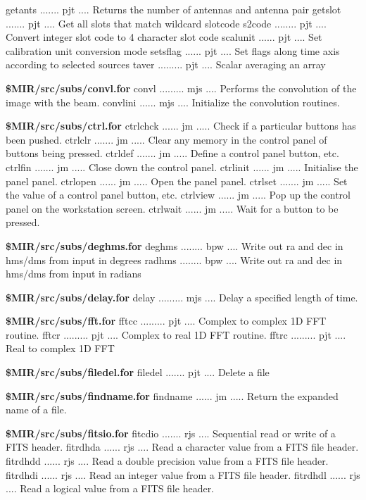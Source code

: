 {\eightpoint\begintt
getants ....... pjt .... Returns the number of antennas and antenna pair
getslot ....... pjt .... Get all slots that match wildcard slotcode
s2code ........ pjt .... Convert integer slot code to 4 character slot code
scalunit ...... pjt .... Set calibration unit conversion mode
setsflag ...... pjt .... Set flags along time axis according to selected sources
\endtt}
{\eightpoint\begintt
taver ......... pjt .... Scalar averaging an array
\endtt}
\par{\bf \$MIR/src/subs/convl.for}
{\eightpoint\begintt
convl ......... mjs .... Performs the convolution of the image with the beam.
convlini ...... mjs .... Initialize the convolution routines.
\endtt}
\par{\bf \$MIR/src/subs/ctrl.for}
{\eightpoint\begintt
ctrlchck ...... jm ..... Check if a particular buttons has been pushed.
ctrlclr ....... jm ..... Clear any memory in the control panel of buttons being pressed.
ctrldef ....... jm ..... Define a control panel button, etc.
ctrlfin ....... jm ..... Close down the control panel.
ctrlinit ...... jm ..... Initialise the panel panel.
\endtt}
{\eightpoint\begintt
ctrlopen ...... jm ..... Open the panel panel.
ctrlset ....... jm ..... Set the value of a control panel button, etc.
ctrlview ...... jm ..... Pop up the control panel on the workstation screen.
ctrlwait ...... jm ..... Wait for a button to be pressed.
\endtt}
\par{\bf \$MIR/src/subs/deghms.for}
{\eightpoint\begintt
deghms ........ bpw .... Write out ra and dec in hms/dms from input in degrees
radhms ........ bpw .... Write out ra and dec in hms/dms from input in radians
\endtt}
\par{\bf \$MIR/src/subs/delay.for}
{\eightpoint\begintt
delay ......... mjs .... Delay a specified length of time.
\endtt}
\par{\bf \$MIR/src/subs/fft.for}
{\eightpoint\begintt
fftcc ......... pjt .... Complex to complex 1D FFT routine.
fftcr ......... pjt .... Complex to real 1D FFT routine.
fftrc ......... pjt .... Real to complex 1D FFT
\endtt}
\par{\bf \$MIR/src/subs/filedel.for}
{\eightpoint\begintt
filedel ....... pjt .... Delete a file
\endtt}
\par{\bf \$MIR/src/subs/findname.for}
{\eightpoint\begintt
findname ...... jm ..... Return the expanded name of a file.
\endtt}
\par{\bf \$MIR/src/subs/fitsio.for}
{\eightpoint\begintt
fitcdio ....... rjs .... Sequential read or write of a FITS header.
fitrdhda ...... rjs .... Read a character value from a FITS file header.
fitrdhdd ...... rjs .... Read a double precision value from a FITS file header.
fitrdhdi ...... rjs .... Read an integer value from a FITS file header.
fitrdhdl ...... rjs .... Read a logical value from a FITS file header.
\endtt}
